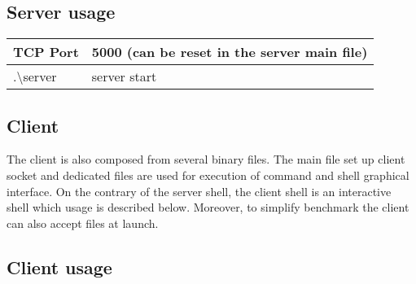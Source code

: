 \documentclass[a4paper,11pt]{report}
\begin{document}
    \subsection*{Server usage}

    \begin{centering}
        \begin{tabular}{|m{3cm}|m{7cm}|}
            \hline
            TCP Port & 5000 (can be reset in the server main file) \\
            \hline
            .\textbackslash server & server start \\
            \hline
        \end{tabular}
    \end{centering}

    \subsection*{Client}
    The client is also composed from several binary files.
    The main file set up client socket and dedicated files are used for execution of command and shell graphical interface.
    On the contrary of the server shell, the client shell is an interactive shell which usage is described below.
    Moreover, to simplify benchmark the client can also accept files at launch.

    \subsection*{Client usage}
\end{document}

